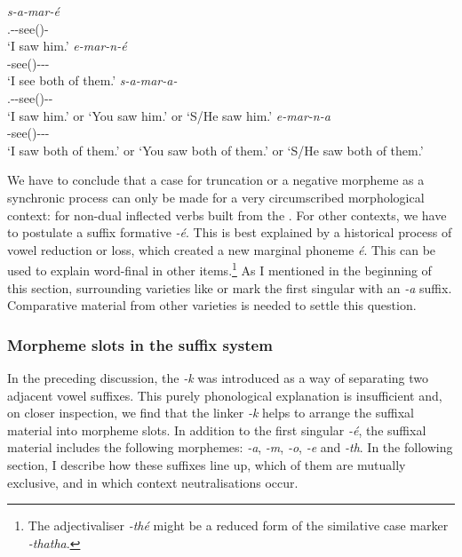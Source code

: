 \begin{exe}
\ex
\begin{xlist}
	\ex
	\gll \emph{s-a-mar-é}\\
	\Tsg.\Masc-\Ndu-see(\Rs)-\Fnsg\\
	\trans `I saw him.'
	\label{ex207}
	\ex
	\gll \emph{e-mar-n-é}\\
	\Stnsg-see(\Ext)-\Ndu-\Pst-\Sg\\
	\trans `I see both of them.'
	\label{ex206}
	\ex
	\gll \emph{s-a-mar-a-\Zero{}}\\
	\Tsg.\Masc-\Ndu-see(\Rs)-\Pst-\Sg\\
	\trans `I saw him.' or `You saw him.' or `S/He saw him.'
	\label{ex208}
	\ex
	\gll \emph{e-mar-n-a}\\
	\Stnsg-see(\Ext)-\Ndu-\Pst-\Sg\\
	\trans `I saw both of them.' or `You saw both of them.' or `S/He saw both of them.'
	\label{ex209}
\end{xlist}
\end{exe}

We have to conclude that a case for truncation or a negative morpheme as a synchronic process can only be made for a very circumscribed morphological context: for non-dual inflected verbs built from the . For other contexts, we have to postulate a suffix formative \emph{-é}. This is best explained by a historical process of vowel reduction or  loss, which created a new marginal phoneme \emph{é}. This can be used to explain word-final  in other items.\footnote{The adjectivaliser \emph{-thé} might be a reduced form of the similative case marker \emph{-thatha}.} As I mentioned in the beginning of this section, surrounding varieties like  or  mark the first  singular with an \emph{-a} suffix. Comparative material from other  varieties is needed to settle this question.

\subsubsection{Morpheme slots in the suffix system}\label{personsufffslots}

In the preceding discussion, the  \emph{-k} was introduced as a way of separating two adjacent vowel suffixes. This purely phonological explanation is insufficient and, on closer inspection, we find that the linker \emph{-k} helps to arrange the suffixal material into morpheme slots. In addition to the first singular \emph{-é}, the suffixal material includes the following morphemes:  \emph{-a},  \emph{-m},  \emph{-o}, {\Fnsg} \emph{-e} and \Stnsg{} \emph{-th}. In the following section, I describe how these suffixes line up, which of them are mutually exclusive, and in which context  neutralisations occur.

